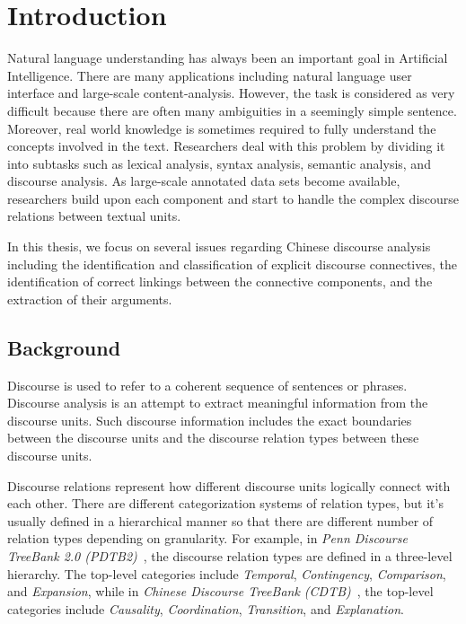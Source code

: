 %
%
%
\chapter{Introduction}
\label{c:intro}

Natural language understanding has always been an important goal in Artificial
Intelligence. There are many applications including natural language user
interface and large-scale content-analysis. However, the task is considered
as very difficult because there are often many ambiguities in a seemingly
simple sentence. Moreover, real world knowledge is sometimes required to fully
understand the concepts involved in the text. Researchers deal with this problem
by dividing it into subtasks such as lexical analysis, syntax analysis, semantic
analysis, and discourse analysis. As large-scale annotated data sets become
available, researchers build upon each component and start to handle the
complex discourse relations between textual units.

In this thesis, we focus on several issues regarding Chinese discourse analysis
including the identification and classification of explicit discourse connectives,
the identification of correct linkings between the connective components,
and the extraction of their arguments. 

%
%
\section{Background}

Discourse is used to refer to a coherent sequence of sentences or phrases.
Discourse analysis is an attempt to extract meaningful information from
the discourse units. Such discourse information includes the exact boundaries
between the discourse units and the discourse relation types between
these discourse units.

Discourse relations represent how different discourse units logically connect
with each other.  There are different categorization systems of relation types, but
it's usually defined in a hierarchical manner so that there are different number
of relation types depending on granularity. For example, in
\textit{Penn Discourse TreeBank 2.0 (PDTB2)}~\citep{Prasad08thepenn}, the discourse
relation types are defined in a three-level hierarchy. The top-level categories
include \textit{Temporal}, \textit{Contingency}, \textit{Comparison},
and \textit{Expansion}, while in
\textit{Chinese Discourse TreeBank (CDTB)}~\citep{li2014building}, 
the top-level categories include \textit{Causality}, \textit{Coordination},
\textit{Transition}, and \textit{Explanation}.

